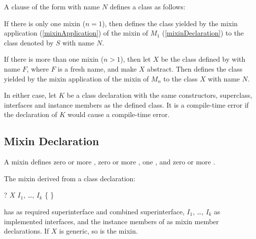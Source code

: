 \documentclass[makeidx]{article}
\begin{document}
\LMHash{}%
A clause of the form 
with name $N$ defines a class as follows:

\LMHash{}%
If there is only one mixin ($n = 1$), then 
defines the class yielded by the mixin application (\ref{mixinApplication})
of the mixin of $M_1$ (\ref{mixinDeclaration}) to the class denoted by
$S$ with name $N$.

\LMHash{}%
If there is more than one mixin ($n > 1$), then
let $X$ be the class defined by 
with name $F$, where $F$ is a fresh name, and make $X$ abstract.
Then  defines the class yielded
by the mixin application of the mixin of $M_n$ to the class $X$ with name $N$.

\LMHash{}%
In either case, let $K$ be a class declaration with the same constructors, superclass, interfaces and instance members as the defined class.
It is a compile-time error if the declaration of $K$ would cause a compile-time error.


\subsection{Mixin Declaration}

\LMHash{}%
A mixin defines zero or more ,
zero or more ,
one ,
and zero or more .

\LMHash{}%
The mixin derived from a class declaration:

\begin{normativeDartCode}
\ABSTRACT? \CLASS{} $X$ \IMPLEMENTS{} $I_1$, \ldots{}, $I_k$ \{
\}
\end{normativeDartCode}

has  as required superinterface
and combined superinterface,
$I_1$, \ldots, $I_k$ as implemented interfaces,
and the instance members of  as mixin member declarations.
If $X$ is generic, so is the mixin.
\end{document}

